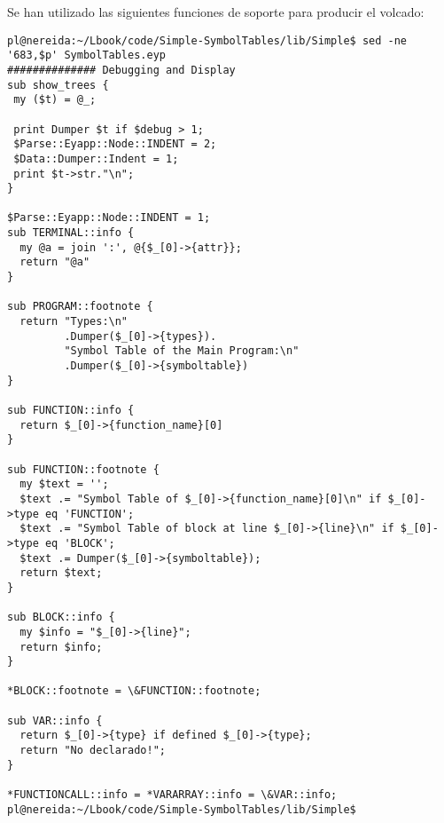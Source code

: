 
Se han utilizado las siguientes funciones de soporte para producir el volcado:

\begin{verbatim}
pl@nereida:~/Lbook/code/Simple-SymbolTables/lib/Simple$ sed -ne '683,$p' SymbolTables.eyp
############## Debugging and Display
sub show_trees {
 my ($t) = @_;

 print Dumper $t if $debug > 1;
 $Parse::Eyapp::Node::INDENT = 2;
 $Data::Dumper::Indent = 1;
 print $t->str."\n";
}

$Parse::Eyapp::Node::INDENT = 1;
sub TERMINAL::info {
  my @a = join ':', @{$_[0]->{attr}};
  return "@a"
}

sub PROGRAM::footnote {
  return "Types:\n"
         .Dumper($_[0]->{types}).
         "Symbol Table of the Main Program:\n"
         .Dumper($_[0]->{symboltable})
}

sub FUNCTION::info {
  return $_[0]->{function_name}[0]
}

sub FUNCTION::footnote {
  my $text = '';
  $text .= "Symbol Table of $_[0]->{function_name}[0]\n" if $_[0]->type eq 'FUNCTION';
  $text .= "Symbol Table of block at line $_[0]->{line}\n" if $_[0]->type eq 'BLOCK';
  $text .= Dumper($_[0]->{symboltable});
  return $text;
}

sub BLOCK::info {
  my $info = "$_[0]->{line}";
  return $info;
}

*BLOCK::footnote = \&FUNCTION::footnote;

sub VAR::info {
  return $_[0]->{type} if defined $_[0]->{type};
  return "No declarado!";
}

*FUNCTIONCALL::info = *VARARRAY::info = \&VAR::info;
pl@nereida:~/Lbook/code/Simple-SymbolTables/lib/Simple$        
\end{verbatim}
%
%
%
%
